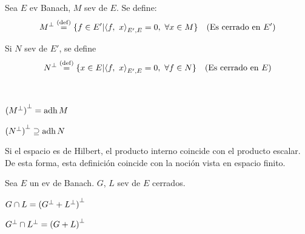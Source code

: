 
\renewcommand{\catnum}{\theNPclase \ No Presencial}%
\renewcommand{\fecha}{13 de abril de 2020}


\begin{defn} 
Sea $E$ ev Banach, $M$ sev de $E$. Se define:
$$M\ort \defeq \{ f \in E' | \prodint[E', E]{f}{x} = 0, \ \forall x \in M \} \quad \text{(Es cerrado en $E'$)}$$


Si $N$ sev de $E'$, se define
$$N\ort \defeq \{ x \in E | \prodint[E', E]{f}{x} = 0, \ \forall f \in N \} \quad \text{(Es cerrado en $E$)}$$
\end{defn}

\begin{prop} \\
\begin{ienumerate}
    \item ${(M\ort)}\ort = \adh M$
    \item ${(N\ort)}\ort \supseteq \adh N$
\end{ienumerate}
\end{prop}

Si el espacio es de Hilbert, el producto interno coincide con el producto escalar. De esta forma, esta definición coincide con la noción vista en espacio finito.

\begin{prop}
Sea $E$ un ev de Banach. $G$, $L$ sev de $E$ cerrados.
\begin{ienumerate}
    \item $G \cap L = {(G\ort + L\ort)}\ort$
    \item $G\ort \cap L\ort = {(G + L)}\ort$
\end{ienumerate}

\end{prop}

